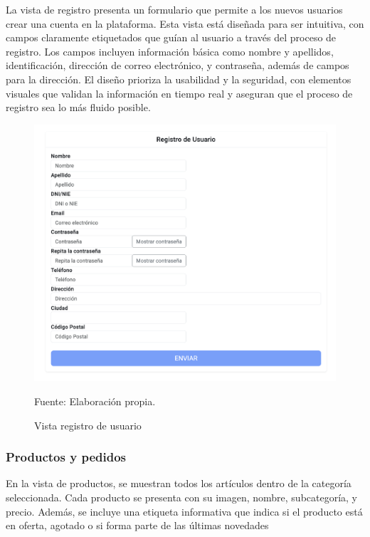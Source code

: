 La vista de registro presenta un formulario que permite a los nuevos usuarios crear una cuenta en la plataforma. Esta vista está diseñada para ser intuitiva, con campos claramente etiquetados que guían al usuario a través del proceso de registro. Los campos incluyen información básica como nombre y apellidos, identificación, dirección de correo electrónico, y contraseña, además de campos para la dirección. El diseño prioriza la usabilidad y la seguridad, con elementos visuales que validan la información en tiempo real y aseguran que el proceso de registro sea lo más fluido posible.

\begin{figure}[H]
\begin{center}
\includegraphics[scale=0.5]{./Images/vista_registro.png}
\caption{Vista registro de usuario} Fuente: Elaboración propia.

\label{fig:fig2}

\end{center}
\end{figure}

\subsubsection{Productos y pedidos}\label{subsec5.1.1.2}

En la vista de productos, se muestran todos los artículos dentro de la categoría seleccionada. Cada producto se presenta con su imagen, nombre, subcategoría, y precio. Además, se incluye una etiqueta informativa que indica si el producto está en oferta, agotado o si forma parte de las últimas novedades

